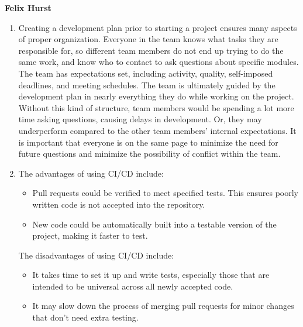 \documentclass{article}
\begin{document}
\textbf{Felix Hurst}
\begin{enumerate}
\item{Creating a development plan prior to starting a project ensures many aspects of proper organization. Everyone in the team knows what tasks they are responsible for, so different team members do not end up trying to do the same work, and know who to contact to ask questions about specific modules. The team has expectations set, including activity, quality, self-imposed deadlines, and meeting schedules. The team is ultimately guided by the development plan in nearly everything they do while working on the project. Without this kind of structure, team members would be spending a lot more time asking questions, causing delays in development. Or, they may underperform compared to the other team members’ internal expectations. It is important that everyone is on the same page to minimize the need for future questions and minimize the possibility of conflict within the team.}
\item{The advantages of using CI/CD include:
\begin{itemize}
\item{Pull requests could be verified to meet specified tests. This ensures poorly written code is not accepted into the repository.}
\item{New code could be automatically built into a testable version of the project, making it faster to test.}
\end{itemize}

The disadvantages of using CI/CD include:
\begin{itemize}
\item{It takes time to set it up and write tests, especially those that are intended to be universal across all newly accepted code.}
\item{It may slow down the process of merging pull requests for minor changes that don’t need extra testing.}
\end{itemize}
}
\end{enumerate}
\end{document}
